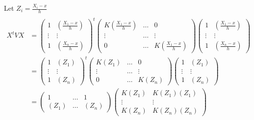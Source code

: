 \documentclass[11pt, oneside]{article}   	%
\begin{document}
Let $ Z_i = \frac{X_i-x}{h}$ \\
\begin{equation*}
\begin{split}
\\
X^t V X & = \left(\begin{array}{cccc}1 & \left(\frac{X_1-x}{h}\right) \\ \vdots & \vdots \\ 1 & \left(\frac{X_n-x}{h}\right) \end{array}\right)^t  
\left(\begin{array}{cccc} K\left(\frac{X_1-x}{h}\right) & \ldots & 0 \\ \vdots & \ldots & \vdots \\ 0 & \ldots & K\left(\frac{X_1-x}{h}\right)\end{array}\right) 
\left(\begin{array}{cccc}1 & \left(\frac{X_1-x}{h}\right) \\ \vdots & \vdots \\ 1 & \left(\frac{X_n-x}{h}\right) \end{array}\right)\\
& = \left(\begin{array}{cccc}1 & \left(Z_1\right) \\ \vdots & \vdots \\ 1 & \left(Z_n\right) \end{array}\right)^t  
\left(\begin{array}{cccc} K\left(Z_1\right) & \ldots & 0 \\ \vdots & \ldots & \vdots \\ 0 & \ldots & K\left(Z_n\right)\end{array}\right) 
\left(\begin{array}{cccc}1 & \left(Z_1\right) \\ \vdots & \vdots \\ 1 & \left(Z_n\right) \end{array}\right)\\
& = \left(\begin{array}{cccc}1 & \ldots & 1 \\ \left(Z_1\right) & \ldots & \left(Z_n\right) \end{array}\right) 
\left(\begin{array}{cccc}K\left(Z_1\right) & K\left(Z_1\right)\left(Z_1\right) \\ \vdots & \vdots \\ K\left(Z_n\right) & K\left(Z_n\right)\left(Z_n\right) \end{array}\right)\\

\end{split}
\end{equation*}
\end{document}
